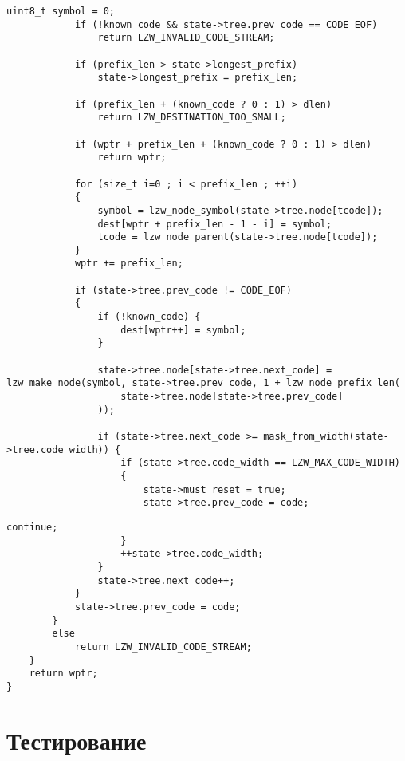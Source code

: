 \begin{center}
    \captionsetup{justification=raggedright,singlelinecheck=off}
    \begin{lstlisting}[label=lst:decompress-3,caption=Реализация алгоритма разжатия  LZW (часть 3)]
			uint8_t symbol = 0;
			if (!known_code && state->tree.prev_code == CODE_EOF)
				return LZW_INVALID_CODE_STREAM;

			if (prefix_len > state->longest_prefix)
				state->longest_prefix = prefix_len;

			if (prefix_len + (known_code ? 0 : 1) > dlen)
				return LZW_DESTINATION_TOO_SMALL;

			if (wptr + prefix_len + (known_code ? 0 : 1) > dlen)
				return wptr;

			for (size_t i=0 ; i < prefix_len ; ++i)
            {
				symbol = lzw_node_symbol(state->tree.node[tcode]);
				dest[wptr + prefix_len - 1 - i] = symbol;
				tcode = lzw_node_parent(state->tree.node[tcode]);
			}
			wptr += prefix_len;

			if (state->tree.prev_code != CODE_EOF)
            {
				if (!known_code) {
					dest[wptr++] = symbol;
				}

				state->tree.node[state->tree.next_code] = lzw_make_node(symbol, state->tree.prev_code, 1 + lzw_node_prefix_len(
					state->tree.node[state->tree.prev_code]
				));

				if (state->tree.next_code >= mask_from_width(state->tree.code_width)) {
					if (state->tree.code_width == LZW_MAX_CODE_WIDTH)
                    {
						state->must_reset = true;
						state->tree.prev_code = code;
\end{lstlisting}
\end{center}

\begin{center}
    \captionsetup{justification=raggedright,singlelinecheck=off}
    \begin{lstlisting}[label=lst:decompress-4,caption=Реализация алгоритма разжатия  LZW (часть 4)]
						continue;
					}
					++state->tree.code_width;
				}
				state->tree.next_code++;
			}
			state->tree.prev_code = code;
		}
        else
			return LZW_INVALID_CODE_STREAM;
	}
	return wptr;
}
\end{lstlisting}
\end{center}

\section{Тестирование}

